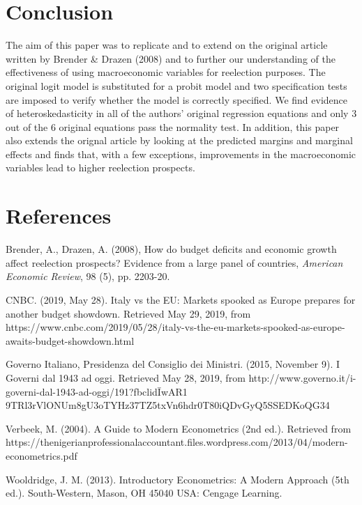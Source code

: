 \documentclass[12pt]{article}
\begin{document}
\section{Conclusion}
The aim of this paper was to replicate and to extend on the original article written by Brender \& Drazen (2008) and to further our understanding of the effectiveness of using macroeconomic variables for reelection purposes. The original logit model is substituted for a probit model and two specification tests are imposed to verify whether the model is correctly specified. We find evidence of heteroskedasticity in all of the authors' original regression equations and only 3 out of the 6 original equations pass the normality test. In addition, this paper also extends the orignal article by looking at the predicted margins and marginal effects and finds that, with a few exceptions, improvements in the macroeconomic variables lead to higher reelection prospects. 
\pagebreak
\section{References}
\item Brender, A., Drazen, A. (2008), How do budget deficits and economic growth affect reelection prospects? Evidence from a large panel of countries, \textit{American Economic Review}, 98 (5), pp. 2203-20.
\item CNBC. (2019, May 28). Italy vs the EU: Markets spooked as Europe prepares for another budget showdown. Retrieved May 29, 2019, from https://www.cnbc.com/2019/05/28/italy-vs-the-eu-markets-spooked-as-europe-awaits-budget-showdown.html
\item Governo Italiano, Presidenza del Consiglio dei Ministri. (2015, November 9). I Governi dal 1943 ad oggi. Retrieved May 28, 2019, from {http://www.governo.it/i-governi-dal-1943-ad-oggi/191?fbclid\=IwAR1\\
9TRl3rVlONUm8gU3oTYHz37TZ5txVn6hdr0T80iQDvGyQ5SSEDKoQG34}
\item Verbeek, M. (2004). A Guide to Modern Econometrics (2nd ed.). Retrieved from \\https://thenigerianprofessionalaccountant.files.wordpress.com/2013/04/modern-econometrics.pdf
\item Wooldridge, J. M. (2013). Introductory Econometrics: A Modern Approach (5th ed.). South-Western, Mason, OH 45040 USA: Cengage Learning.
\end{document}
